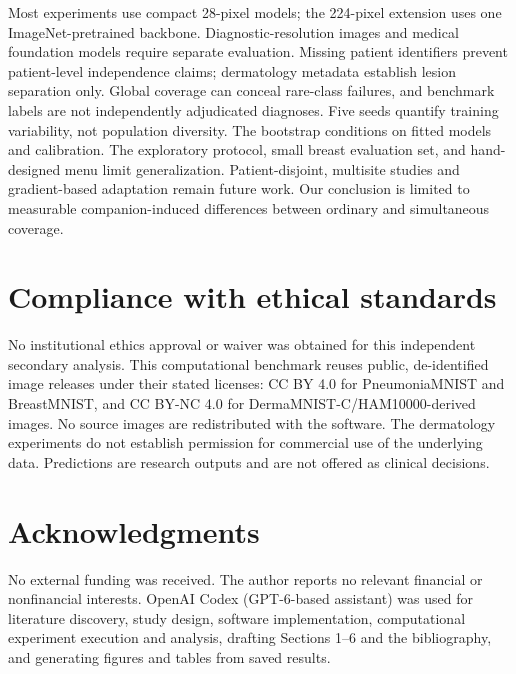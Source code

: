 \documentclass{article}
\begin{document}
Most experiments use compact 28-pixel models; the 224-pixel extension uses one ImageNet-pretrained backbone. Diagnostic-resolution images and medical foundation models require separate evaluation. Missing patient identifiers prevent patient-level independence claims; dermatology metadata establish lesion separation only. Global coverage can conceal rare-class failures, and benchmark labels are not independently adjudicated diagnoses. Five seeds quantify training variability, not population diversity. The bootstrap conditions on fitted models and calibration. The exploratory protocol, small breast evaluation set, and hand-designed menu limit generalization. Patient-disjoint, multisite studies and gradient-based adaptation remain future work. Our conclusion is limited to measurable companion-induced differences between ordinary and simultaneous coverage.

\section{Compliance with ethical standards}
No institutional ethics approval or waiver was obtained for this independent secondary analysis. This computational benchmark reuses public, de-identified image releases under their stated licenses: CC BY 4.0 for PneumoniaMNIST and BreastMNIST, and CC BY-NC 4.0 for DermaMNIST-C/HAM10000-derived images. No source images are redistributed with the software. The dermatology experiments do not establish permission for commercial use of the underlying data. Predictions are research outputs and are not offered as clinical decisions.

\section{Acknowledgments}
No external funding was received. The author reports no relevant financial or nonfinancial interests. OpenAI Codex (GPT-6-based assistant) was used for literature discovery, study design, software implementation, computational experiment execution and analysis, drafting Sections 1--6 and the bibliography, and generating figures and tables from saved results.



\end{document}

